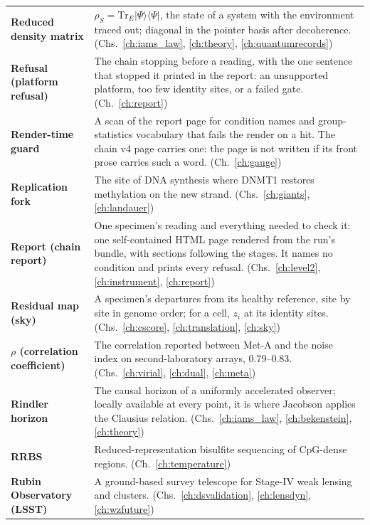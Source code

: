 {\begin{longtable}{@{}>{\raggedright\arraybackslash}p{}>{\raggedright\arraybackslash}p{}@{}}
\textbf{Reduced density matrix} & $\rho_S=\mathrm{Tr}_E|\Psi\rangle\langle\Psi|$, the state of a system with the environment traced out; diagonal in the pointer basis after decoherence. {\footnotesize(Chs.~\ref{ch:iams_law}, \ref{ch:theory}, \ref{ch:quantumrecords})}\\[1pt]
\textbf{Refusal (platform refusal)} & The chain stopping before a reading, with the one sentence that stopped it printed in the report: an unsupported platform, too few identity sites, or a failed gate. {\footnotesize(Ch.~\ref{ch:report})}\\[1pt]
\textbf{Render-time guard} & A scan of the report page for condition names and group-statistics vocabulary that fails the render on a hit. The chain v4 page carries one: the page is not written if its front prose carries such a word. {\footnotesize(Ch.~\ref{ch:gauge})}\\[1pt]
\textbf{Replication fork} & The site of DNA synthesis where DNMT1 restores methylation on the new strand. {\footnotesize(Chs.~\ref{ch:giants}, \ref{ch:landauer})}\\[1pt]
\textbf{Report (chain report)} & One specimen's reading and everything needed to check it: one self-contained HTML page rendered from the run's bundle, with sections following the stages. It names no condition and prints every refusal. {\footnotesize(Chs.~\ref{ch:level2}, \ref{ch:instrument}, \ref{ch:report})}\\[1pt]
\textbf{Residual map (sky)} & A specimen's departures from its healthy reference, site by site in genome order; for a cell, $z_i$ at its identity sites. {\footnotesize(Chs.~\ref{ch:cscore}, \ref{ch:translation}, \ref{ch:sky})}\\[1pt]
\textbf{$\rho$ (correlation coefficient)} & The correlation reported between Met-A and the noise index on second-laboratory arrays, 0.79--0.83. {\footnotesize(Chs.~\ref{ch:virial}, \ref{ch:dual}, \ref{ch:meta})}\\[1pt]
\textbf{Rindler horizon} & The causal horizon of a uniformly accelerated observer; locally available at every point, it is where Jacobson applies the Clausius relation. {\footnotesize(Chs.~\ref{ch:iams_law}, \ref{ch:bekenstein}, \ref{ch:theory})}\\[1pt]
\textbf{RRBS} & Reduced-representation bisulfite sequencing of CpG-dense regions. {\footnotesize(Ch.~\ref{ch:temperature})}\\[1pt]
\textbf{Rubin Observatory (LSST)} & A ground-based survey telescope for Stage-IV weak lensing and clusters. {\footnotesize(Chs.~\ref{ch:dsvalidation}, \ref{ch:lensdyn}, \ref{ch:wzfuture})}\\[1pt]

\end{longtable}}
